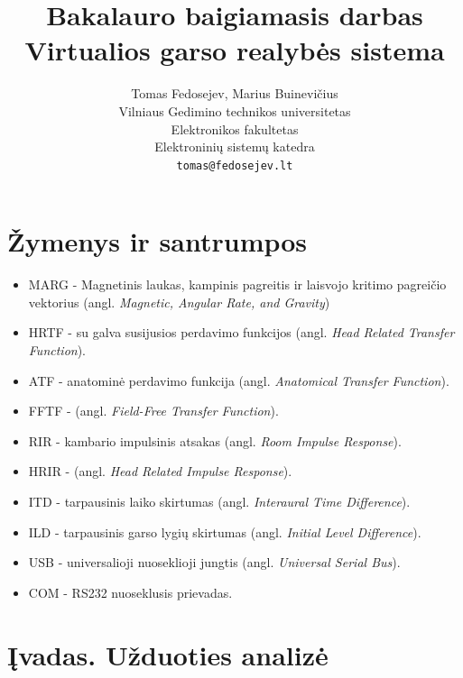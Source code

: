 \documentclass[]{vgtuef}
\author{Tomas Fedosejev, Marius Buinevičius\\Vilniaus Gedimino technikos
  universitetas\\Elektronikos fakultetas\\Elektroninių sistemų
  katedra\\\texttt{tomas@fedosejev.lt}}
\title{Bakalauro baigiamasis darbas\\Virtualios garso realybės sistema}
\begin{document}
\setcounter{page}{7}
\onehalfspacing

\tableofcontents


\section*{Žymenys ir santrumpos}

\begin{itemize}
\item MARG - Magnetinis laukas, kampinis pagreitis ir laisvojo kritimo pagreičio vektorius (angl. \textit{Magnetic, Angular Rate, and Gravity})
\item HRTF - su galva susijusios perdavimo funkcijos (angl. \textit{Head Related Transfer Function}).
\item ATF - anatominė perdavimo funkcija (angl. \textit{Anatomical Transfer Function}).
\item FFTF - (angl. \textit{Field-Free Transfer Function}).
\item RIR - kambario impulsinis atsakas (angl. \textit{Room Impulse Response}).
\item HRIR - (angl. \textit{Head Related Impulse Response}).
\item ITD - tarpausinis laiko skirtumas (angl. \textit{Interaural Time Difference}).
\item ILD - tarpausinis garso lygių skirtumas (angl. \textit{Initial Level Difference}).
\item USB - universalioji nuoseklioji jungtis (angl. \textit{Universal Serial Bus}).
\item COM - RS232 nuoseklusis prievadas.

\end{itemize}

\section{Įvadas. Užduoties analizė}
\end{document}

